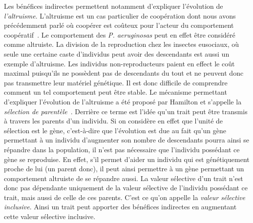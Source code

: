 		Les bénéfices indirectes permettent notamment d'expliquer l'évolution de \emph{l'altruisme}. L'altruisme est un cas particulier de coopération dont nous avons précédemment parlé où coopérer est coûteux pour l'acteur du comportement coopératif~\parencite{Hamilton1964, West2007a}. Le comportement des \emph{P. aeruginosas} peut en effet être considéré comme altruiste. La division de la reproduction chez les insectes eusociaux, où seule une certaine caste d'individus peut avoir des descendants est aussi un exemple d'altruisme. Les individus non-reproducteurs paient en effect le coût maximal puisqu'ils ne possèdent pas de descendants du tout et ne peuvent donc pas transmettre leur matériel génétique. Il est donc difficile de comprendre comment un tel comportement peut être stable. Le mécanisme permettant d'expliquer l'évolution de l'altruisme a été proposé par Hamilton et s'appelle la \emph{sélection de parentèle}~\parencite{Hamilton1964}. Derrière ce terme est l'idée qu'un trait peut être transmis à travers les parents d'un individu. Si on considère en effet que l'unité de sélection est le gène, c'est-à-dire que l'évolution est due au fait qu'un gène permettant à un individu d'augmenter son nombre de descendants pourra ainsi se répandre dans la population, il n'est pas nécessaire que l'individu possédant ce gène se reproduise. En effet, s'il permet d'aider un individu qui est génétiquement proche de lui (un parent donc), il peut ainsi permettre à un gène permettant un comportement altruiste de se répandre aussi. La valeur sélective d'un trait n'est donc pas dépendante uniquement de la valeur sélective de l'individu possédant ce trait, mais aussi de celle de ces parents. C'est ce qu'on appelle la \emph{valeur sélective inclusive}. Ainsi un trait peut apporter des bénéfices indirectes en augmentant cette valeur sélective inclusive.

